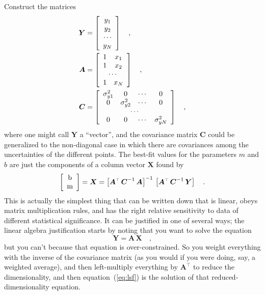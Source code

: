 \documentclass[12pt,twoside]{article}
\newcommand{\equationname}{equation}
\newcommand{\mmatrix}[1]{\boldsymbol{#1}}
\newcommand{\inverse}[1]{{#1}^{-1}}
\newcommand{\transpose}[1]{{#1}^{\scriptscriptstyle \top}}
\newcommand{\mA}{\mmatrix{A}}
\newcommand{\mAT}{\transpose{\mA}}
\newcommand{\mC}{\mmatrix{C}}
\newcommand{\mCinv}{\inverse{\mC}}
\newcommand{\mX}{\mmatrix{X}}
\newcommand{\mY}{\mmatrix{Y}}
\begin{document}
Construct the matrices
\begin{align}\label{eq:mY}
\mY &= \left[\begin{array}{c}
y_1 \\
y_2 \\
\cdots \\
y_N
\end{array}\right] \quad ,\\
\mA &= \left[\begin{array}{cc}
1 & x_1 \\
1 & x_2 \\
\multicolumn{2}{c}{\cdots} \\
1 & x_N
\end{array}\right] \quad ,\\
\mC & = \left[\begin{array}{cccc}
\sigma_{y1}^{2} & 0 & \cdots & 0 \\
0 & \sigma_{y2}^{2} & \cdots & 0 \\
\multicolumn{4}{c}{\cdots} \\
0 & 0 & \cdots & \sigma_{yN}^{2}
\end{array}\right] \quad ,\label{eq:covar}
\end{align}
where one might call $\mY$ a ``vector'', and the covariance matrix
$\mC$ could be generalized to the non-diagonal case in which there are
covariances among the uncertainties of the different points.  The
best-fit values for the parameters $m$ and $b$ are just the components
of a column vector $\mX$ found by
\begin{equation}\label{eq:lsf}
\left[\begin{array}{c} $b$ \\ $m$ \end{array}\right]
 = \mX = \inverse{\left[\mAT\,\mCinv\,\mA\right]}
  \,\left[\mAT\,\mCinv\,\mY\right] \quad .
\end{equation}
This is actually the simplest thing that can be written down that is
linear, obeys matrix multiplication rules, and has the right relative
sensitivity to data of different statistical significance.  It can be
justified in one of several ways; the linear algebra justification
starts by noting that you want to solve the equation
\begin{equation}
\mY = \mA\,\mX \quad ,
\end{equation}
but you can't because that equation is over-constrained.  So you
weight everything with the inverse of the covariance matrix (as you
would if you were doing, say, a weighted average), and then
left-multiply everything by $\mAT$ to reduce the dimensionality, and
then \equationname~(\ref{eq:lsf}) is the solution of that
reduced-dimensionality equation.
\end{document}

